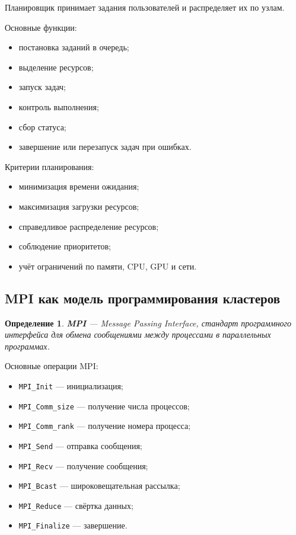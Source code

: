 \documentclass[12pt,a4paper]{article}
\newtheorem{definition}{Определение}
\begin{document}
Планировщик принимает задания пользователей и распределяет их по узлам.

Основные функции:
\begin{itemize}
    \item постановка заданий в очередь;
    \item выделение ресурсов;
    \item запуск задач;
    \item контроль выполнения;
    \item сбор статуса;
    \item завершение или перезапуск задач при ошибках.
\end{itemize}

Критерии планирования:
\begin{itemize}
    \item минимизация времени ожидания;
    \item максимизация загрузки ресурсов;
    \item справедливое распределение ресурсов;
    \item соблюдение приоритетов;
    \item учёт ограничений по памяти, CPU, GPU и сети.
\end{itemize}

\subsection{MPI как модель программирования кластеров}

\begin{definition}
\textbf{MPI} --- Message Passing Interface, стандарт программного интерфейса для обмена сообщениями между процессами в параллельных программах.
\end{definition}

Основные операции MPI:
\begin{itemize}
    \item \texttt{MPI\_Init} --- инициализация;
    \item \texttt{MPI\_Comm\_size} --- получение числа процессов;
    \item \texttt{MPI\_Comm\_rank} --- получение номера процесса;
    \item \texttt{MPI\_Send} --- отправка сообщения;
    \item \texttt{MPI\_Recv} --- получение сообщения;
    \item \texttt{MPI\_Bcast} --- широковещательная рассылка;
    \item \texttt{MPI\_Reduce} --- свёртка данных;
    \item \texttt{MPI\_Finalize} --- завершение.
\end{itemize}
\end{document}
